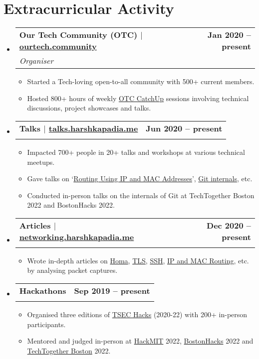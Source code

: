 \documentclass[letterpaper,11pt]{article}
\makeatletter
\newcommand{\resumeItem}[1]{
  \item\small{
    {#1 \vspace{-2pt}}
  }
}
\newcommand{\resumeSubheading}[4]{
  \vspace{-2pt}\item
    \begin{tabular*}{1.0\textwidth}[t]{l@{\extracolsep{\fill}}r}
      \vspace{-2pt}\textbf{#1} & \textbf{\small #2} \\
      \textit{\small#3} & \textit{\small #4} \\
    \end{tabular*}\vspace{-7pt}
}
\newcommand{\resumeSubHeadingListStart}{\begin{itemize}[leftmargin=0.0in, label={}]}
\newcommand{\resumeSubHeadingListEnd}{\end{itemize}}
\newcommand{\resumeItemListStart}{\begin{itemize}}
\newcommand{\resumeItemListEnd}{\end{itemize}\vspace{-5pt}}
\makeatother
\begin{document}
\section{Extracurricular Activity}
    \resumeSubHeadingListStart
        \resumeSubheading
            {\textbf{\normalsize{Our Tech Community (OTC)}} $|$ {\normalfont \href{https://ourtech.community}{ourtech.community}}}{Jan 2020 -- present}
            {Organiser}{}
            \resumeItemListStart
                \resumeItem{Started a Tech-loving open-to-all community with 500+ current members.}
                \resumeItem{Hosted 800+ hours of weekly \href{https://catchup.ourtech.community}{OTC CatchUp} sessions involving technical discussions, project showcases and talks.}
            \resumeItemListEnd

        \resumeSubheading
            {\textbf{\normalsize{Talks}} $|$ {\normalfont \href{https://talks.harshkapadia.me}{talks.harshkapadia.me}}}{Jun 2020 -- present}
            {}{}
            \vspace{-15pt}
            \resumeItemListStart
                \resumeItem{Impacted 700+ people in 20+ talks and workshops at various technical meetups.}
                \resumeItem{Gave talks on `\href{https://talks.harshkapadia.me/mac-and-ip-routing/content}{Routing Using IP and MAC Addresses}', \href{https://talks.harshkapadia.me/git_internals}{Git internals}, etc.}
                \resumeItem{Conducted in-person talks on the internals of Git at TechTogether Boston 2022 and BostonHacks 2022.}
            \resumeItemListEnd

        \resumeSubheading
            {\textbf{\normalsize{Articles}} $|$ {\normalfont \href{https://networking.harshkapadia.me}{networking.harshkapadia.me}}}{Dec 2020 -- present}
            {}{}
            \vspace{-15pt}
            \resumeItemListStart
                \resumeItem{Wrote in-depth articles on \href{https://networking.harshkapadia.me/homa}{Homa}, \href{https://networking.harshkapadia.me/tls}{TLS}, \href{https://networking.harshkapadia.me/ssh}{SSH}, \href{https://talks.harshkapadia.me/mac-and-ip-routing/content}{IP and MAC Routing}, etc. by analysing packet captures.}
            \resumeItemListEnd

        \resumeSubheading
            {\textbf{\normalsize{Hackathons}}}{Sep 2019 -- present}
            {}{}
            \vspace{-16pt}
            \resumeItemListStart
                \resumeItem{Organised three editions of \href{https://tsechacks.tseccodecell.com}{TSEC Hacks} (2020-22) with 200+ in-person participants.}
                \resumeItem{Mentored and judged in-person at \href{https://hackmit.org}{HackMIT} 2022, \href{https://bostonhacks.io}{BostonHacks} 2022 and \href{https://www.techtogether.io/boston}{TechTogether Boston} 2022.}
            \resumeItemListEnd
    \resumeSubHeadingListEnd
\end{document}
